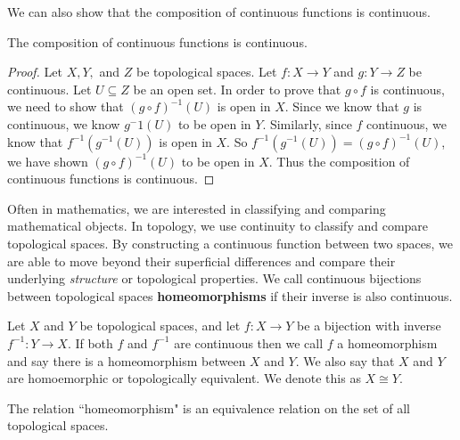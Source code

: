 We can also show that the composition of continuous functions is continuous. 

\begin{prop}\label{prop:cont}
The composition of continuous functions is continuous. 
\end{prop}

\begin{proof}
Let $X,Y,$ and $Z$ be topological spaces. Let $f\colon X \rightarrow Y$ and $g\colon Y\rightarrow Z$ be continuous. Let $U \subseteq Z$ be an open set. In order to prove that $g\circ f$ is continuous, we need to show that $(g\circ f)^{-1}(U)$ is open in $X$. Since we know that $g$ is continuous, we know $g^-1(U)$ to be open in $Y$. Similarly, since $f$ continuous, we know that $f^{-1}(g^{-1}(U))$ is open in $X$. So $f^{-1}(g^{-1}(U))=(g\circ f)^{-1}(U)$, we have shown $(g\circ f)^{-1}(U)$ to be open in $X$. Thus the composition of continuous functions is continuous. 
\end{proof}

Often in mathematics, we are interested in classifying and comparing mathematical objects. In topology, we use continuity to classify and compare topological spaces. By constructing a continuous function between two spaces, we are able to move beyond their superficial differences and compare their underlying \textit{structure} or topological properties. We call continuous bijections between topological spaces \textbf{homeomorphisms} if their inverse is also continuous.


\begin{defn}
Let $X$ and $Y$ be topological spaces, and let $f\colon X\rightarrow Y$ be a bijection with inverse $f^{-1}\colon Y \rightarrow X$. If both $f$ and $f^{-1}$ are continuous then we call $f$ a homeomorphism and say there is a homeomorphism between $X$ and $Y$. We also say that $X$ and $Y$ are homoemorphic or topologically equivalent. We denote this as $X\cong Y$. 
\end{defn}

\begin{prop}
The relation ``homeomorphism" is an equivalence relation on the set of all topological spaces.
\end{prop}

